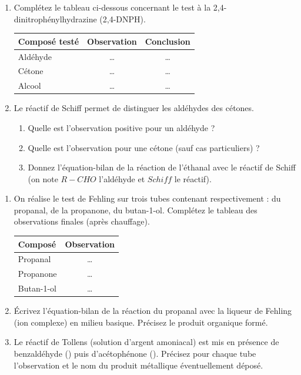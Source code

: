 \documentclass[11pt]{article}
\begin{document}
\begin{exercice}
\begin{enumerate}
    \item Complétez le tableau ci-dessous concernant le test à la 2,4-dinitrophénylhydrazine (2,4-DNPH).
    \begin{center}
    \begin{tabular}{|l|c|c|}
    \hline
    \textbf{Composé testé} & \textbf{Observation} & \textbf{Conclusion} \\
    \hline
    Aldéhyde & \dots & \dots \\
    \hline
    Cétone & \dots & \dots \\
    \hline
    Alcool & \dots & \dots \\
    \hline
    \end{tabular}
    \end{center}
    \item Le réactif de Schiff permet de distinguer les aldéhydes des cétones.
    \begin{enumerate}
        \item Quelle est l'observation positive pour un aldéhyde ?
        \item Quelle est l'observation pour une cétone (sauf cas particuliers) ?
        \item Donnez l'équation-bilan de la réaction de l'éthanal avec le réactif de Schiff (on note $R-CHO$ l'aldéhyde et $Schiff$ le réactif).
    \end{enumerate}
\end{enumerate}
\end{exercice}

\begin{exercice}
\begin{enumerate}
    \item On réalise le test de Fehling sur trois tubes contenant respectivement : du propanal, de la propanone, du butan-1-ol.
    Complétez le tableau des observations finales (après chauffage).
    \begin{center}
    \begin{tabular}{|l|c|}
    \hline
    \textbf{Composé} & \textbf{Observation} \\
    \hline
    Propanal & \dots \\
    \hline
    Propanone & \dots \\
    \hline
    Butan-1-ol & \dots \\
    \hline
    \end{tabular}
    \end{center}
    \item Écrivez l'équation-bilan de la réaction du propanal avec la liqueur de Fehling (ion  complexe) en milieu basique. Précisez le produit organique formé.
    \item Le réactif de Tollens (solution d'argent amoniacal) est mis en présence de benzaldéhyde () puis d'acétophénone ().
    Précisez pour chaque tube l'observation et le nom du produit métallique éventuellement déposé.
\end{enumerate}
\end{exercice}
\end{document}
